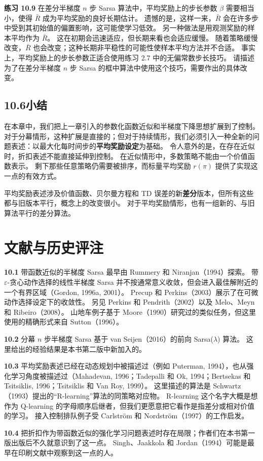 \documentclass[UTF8,12pt,a4paper,fontset=fandol]{ctexart}
\begin{document}
\noindent\textbf{练习 10.9}
在差分半梯度 $n$ 步 Sarsa 算法中，平均奖励上的步长参数 $\beta$ 需要相当小，使得 $\bar R$ 成为平均奖励的良好长期估计。
遗憾的是，这样一来，$\bar R$ 会在许多步中受到其初始值的偏置影响，这可能使学习低效。
另一种做法是用观测奖励的样本平均作为 $\bar R$。
这在初期会迅速适应，但长期来看也会适应缓慢。
随着策略缓慢改变，$\bar R$ 也会改变；这种长期非平稳性的可能性使样本平均方法并不合适。
事实上，平均奖励上的步长参数正适合使用练习 2.7 中的无偏常数步长技巧。
请描述为了在差分半梯度 $n$ 步 Sarsa 的框中算法中使用这个技巧，需要作出的具体改变。

\subsection*{10.6\quad 小结}

在本章中，我们把上一章引入的参数化函数近似和半梯度下降思想扩展到了控制。
对于分幕情形，这种扩展是直接的；但对于持续情形，我们必须引入一种全新的问题表述：以最大化每时间步的\textbf{平均奖励设定}为基础。
令人意外的是，在存在近似时，折扣表述不能直接延伸到控制。
在近似情形中，多数策略不能由一个价值函数表示。
剩下那些任意策略仍需要被排序，而标量平均奖励 $r(\pi)$ 提供了实现这一点的有效方式。

平均奖励表述涉及价值函数、贝尔曼方程和 TD 误差的新\textbf{差分}版本，但所有这些都与旧版本平行，概念上的改变很小。
对于平均奖励情形，也有一组新的、与旧算法平行的差分算法。

\section*{文献与历史评注}

\noindent\textbf{10.1}
带函数近似的半梯度 Sarsa 最早由 Rummery 和 Niranjan（1994）探索。
带 $\varepsilon$-贪心动作选择的线性半梯度 Sarsa 并不按通常意义收敛，但会进入最佳解附近的一个有界区域（Gordon, 1996a, 2001）。
Precup 和 Perkins（2003）展示了在可微动作选择设定下的收敛性。
另见 Perkins 和 Pendrith（2002）以及 Melo、Meyn 和 Ribeiro（2008）。
山地车例子基于 Moore（1990）研究过的类似任务，但这里使用的精确形式来自 Sutton（1996）。

\noindent\textbf{10.2}
分幕 $n$ 步半梯度 Sarsa 基于 van Seijen（2016）的前向 Sarsa($\lambda$) 算法。
这里给出的经验结果是本书第二版中新加入的。

\noindent\textbf{10.3}
平均奖励表述已经在动态规划中被描述过（例如 Puterman, 1994），也从强化学习角度被描述过（Mahadevan, 1996；Tadepalli 和 Ok, 1994；Bertsekas 和 Tsitsiklis, 1996；Tsitsiklis 和 Van Roy, 1999）。
这里描述的算法是 Schwartz（1993）提出的“R-learning”算法的同策略对应物。
R-learning 这个名字大概是想作为 Q-learning 的字母顺序后继者，但我们更愿意把它看作是指差分或相对价值的学习。
接入控制排队例子受 Carlström 和 Nordström（1997）的工作启发。

\noindent\textbf{10.4}
把折扣作为带函数近似的强化学习问题表述时存在局限；作者们在本书第一版出版后不久就意识到了这一点。
Singh、Jaakkola 和 Jordan（1994）可能是最早在印刷文献中观察到这一点的人。
\end{document}
